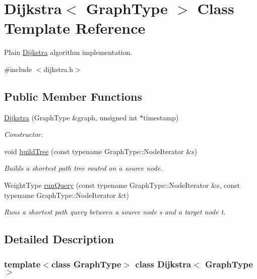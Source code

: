 \hypertarget{class_dijkstra}{
\section{Dijkstra$<$ GraphType $>$ Class Template Reference}
\label{class_dijkstra}
}


Plain \hyperlink{class_dijkstra}{Dijkstra} algorithm implementation.  




{\ttfamily \#include $<$dijkstra.h$>$}

\subsection*{Public Member Functions}
\begin{DoxyCompactItemize}
\item 
\hyperlink{class_dijkstra_a51febd724adf95d1a00e34107febc6d1}{Dijkstra} (GraphType \&graph, unsigned int $\ast$timestamp)
\begin{DoxyCompactList}\small\item\em Constructor. \item\end{DoxyCompactList}\item 
void \hyperlink{class_dijkstra_a8d71229d80ea19a2ad9b40129060954d}{buildTree} (const typename GraphType::NodeIterator \&s)
\begin{DoxyCompactList}\small\item\em Builds a shortest path tree routed on a source node. \item\end{DoxyCompactList}\item 
WeightType \hyperlink{class_dijkstra_a61e3b4e7447de9ab59aeb47408e04c3a}{runQuery} (const typename GraphType::NodeIterator \&s, const typename GraphType::NodeIterator \&t)
\begin{DoxyCompactList}\small\item\em Runs a shortest path query between a source node s and a target node t. \item\end{DoxyCompactList}\end{DoxyCompactItemize}


\subsection{Detailed Description}
\subsubsection*{template$<$class GraphType$>$ class Dijkstra$<$ GraphType $>$}

